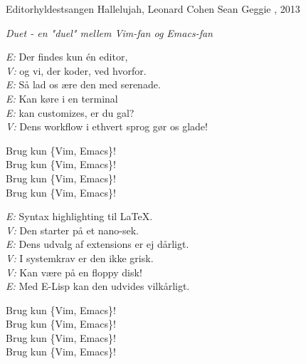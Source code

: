 \begin{song}{Editorhyldestsangen}
  {} %
  {Hallelujah, Leonard Cohen} %
  {Sean Geggie} %
  {\TKET{}, 2013} %
  {\NotCCLIed} %

  \begin{SBSection*}
    \emph{Duet - en "duel" mellem Vim-fan og Emacs-fan}
  \end{SBSection*}

  \begin{SBVerse}
    \emph{E:} Der findes kun én editor,\\
    \emph{V:} og vi, der koder, ved hvorfor.\\
    \emph{E:} Så lad os ære den med serenade.\\
    \emph{E:} Kan køre i en terminal\\
    \emph{E:} kan customizes, er du gal?\\
    \emph{V:} Dens workflow i ethvert sprog gør os glade!
  \end{SBVerse}

  \begin{SBChorus}
    Brug kun \{Vim, Emacs\}!\\
    Brug kun \{Vim, Emacs\}!\\
    Brug kun \{Vim, Emacs\}!\\
    Brug kun \{Vim, Emacs\}!
  \end{SBChorus}

  \begin{SBVerse}
    \emph{E:} Syntax highlighting til \LaTeX.\\
    \emph{V:} Den starter på et nano-sek.\\
    \emph{E:} Dens udvalg af extensions er ej dårligt.\\
    \emph{V:} I systemkrav er den ikke grisk.\\
    \emph{V:} Kan være på en floppy disk!\\
    \emph{E:} Med E-Lisp kan den udvides vilkårligt.
  \end{SBVerse}

  \begin{SBChorus}
    Brug kun \{Vim, Emacs\}!\\
    Brug kun \{Vim, Emacs\}!\\
    Brug kun \{Vim, Emacs\}!\\
    Brug kun \{Vim, Emacs\}!
  \end{SBChorus}


\end{song}
